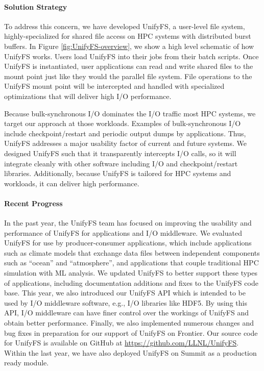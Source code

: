 \paragraph{Solution Strategy}

To address this concern, we have developed UnifyFS, a user-level file system,
highly-specialized for shared file access on HPC systems with distributed
burst buffers. In Figure \ref{fig:UnifyFS-overview}, we show a high
level schematic of how UnifyFS works. Users load UnifyFS into
their jobs from their batch scripts. Once UnifyFS is instantiated, user
applications can read and write shared files to the mount point just like
they would the parallel file system. File operations to the UnifyFS
mount point will be intercepted and handled with specialized optimizations
that will deliver high I/O performance. 

Because bulk-synchronous I/O dominates the 
I/O traffic most HPC systems, we target our approach at
those workloads. Examples of bulk-synchronous I/O include checkpoint/restart
and periodic output dumps by applications. Thus, UnifyFS  addresses a major usability
factor of current and future systems. We designed UnifyFS such
that it transparently intercepts I/O calls, so it will integrate
cleanly with other software including I/O and checkpoint/restart libraries.
Additionally, because UnifyFS is tailored for HPC systems and workloads,
it can deliver high performance.



\paragraph{Recent Progress}

In the past year, the UnifyFS team has focused on improving the usability
and performance of UnifyFS for applications and I/O middleware.
We evaluated UnifyFS for use by producer-consumer applications, which include
applications such as climate models that exchange data files between independent
components such as ``ocean'' and ``atmosphere'', and applications that couple
traditional HPC simulation with ML analysis. We updated UnifyFS to better support
these types of applications, including documentation additions and fixes to the
UnifyFS code base. This year, we also introduced our UnifyFS API which is intended
to be used by I/O middleware software, e.g., I/O libraries like HDF5. By using this
API, I/O middleware can have finer control over the workings of UnifyFS and obtain
better performance. Finally, we also implemented numerous changes and bug fixes
in preparation for our support of UnifyFS on Frontier. 
Our source code for UnifyFS is available on 
GitHub at \url{https://github.com/LLNL/UnifyFS}. Within the last year, we have also deployed UnifyFS on Summit as a production ready module. 

